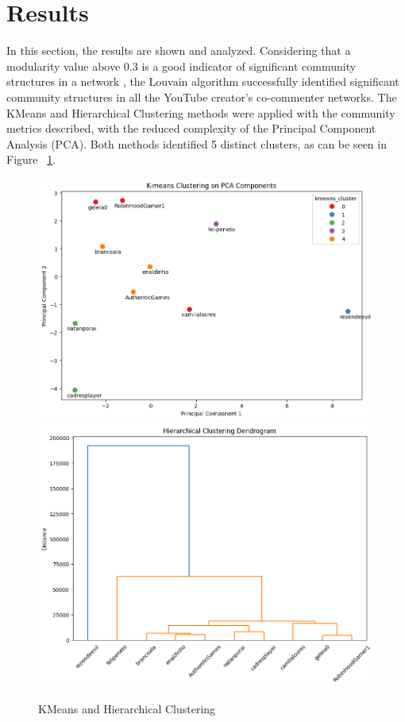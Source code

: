 \documentclass[sigconf]{acmart}
\begin{document}
\section{Results}

In this section, the results are shown and analyzed. 
Considering that a modularity value above 0.3 is a good indicator of significant
community structures in a network \cite{PhysRevE.70.066111}, the Louvain algorithm successfully 
identified significant community structures in all the YouTube creator's co-commenter networks.
The KMeans and Hierarchical Clustering methods were applied with the community metrics described, 
with the reduced complexity of the Principal Component Analysis (PCA). 
Both methods identified 5 distinct clusters, as can be seen in Figure ~\ref{fig:kmeans_hierarchical}.

\begin{figure}[hbt!]
    \centering
    \includegraphics[width=\linewidth]{./imgs/KMeans_PCA.png}
    \vspace{0.5cm} %
    \includegraphics[width=\linewidth]{./imgs/Hierarchical_clustering.png}
    \caption{KMeans and Hierarchical Clustering}
    \label{fig:kmeans_hierarchical}
\end{figure}
\end{document}
